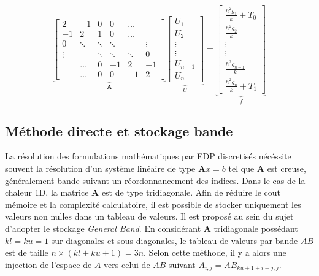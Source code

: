 \documentclass[12pt]{report}
\begin{document}
\begin{equation}
\underbrace{\begin{bmatrix}
2 & -1& 0 & 0 & \hdots&  \\
-1 & 2 &  1 & 0 & \hdots  &  \\
0&  \ddots&\ddots &\ddots && \vdots\\
\vdots& & \ddots&\ddots &\ddots &0 \\
&\hdots &0 & -1&2 & -1 \\
&\hdots &0 &0 &-1 & 2
\end{bmatrix}}_{\mathbf{A}} \underbrace{\begin{bmatrix}
U_1\\
U_2 \\
\vdots\\
\vdots\\
U_{n-1} \\
U_n 
\end{bmatrix}}_{U}=\underbrace{\begin{bmatrix}
\frac{h^2 g_1}{k}+T_0\\
\frac{h^2 g_2}{k}\\
\vdots\\
\vdots\\
\frac{h^2 g_{n-1}}{k} \\
\frac{h^2 g_n}{k} +T_1
\end{bmatrix}}_{f}
\end{equation}




\subsection{Méthode directe et stockage bande}

La résolution des formulations mathématiques par EDP discretisés nécéssite souvent la résolution d'un système linéaire de type $\mathbf{A} x = b$ tel que $\mathbf{A}$ est creuse, généralement bande suivant un réordonnancement des indices. 
Dans le cas de la chaleur 1D, la matrice $\mathbf{A}$ est de type tridiagonale. Afin de réduire le cout mémoire et la complexité calculatoire, il est possible de stocker uniquement les valeurs non nulles dans un tableau de valeurs. Il est proposé au sein du sujet d'adopter le stockage \textit{General Band}. En considérant $\mathbf{A}$ tridiagonale possédant $kl = ku = 1$ sur-diagonales et sous diagonales, le tableau de valeurs par bande $AB$ est de taille $n \times (kl + ku + 1) = 3 n$. Selon cette méthode, il y a alors une injection de l'espace de $A$ vers celui de $AB$ suivant $A_{i,j} = AB_{ku+1+i - j , j}$.
\end{document}
